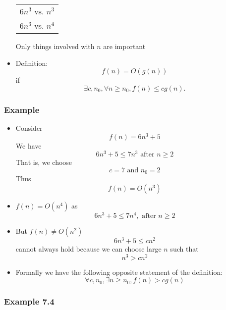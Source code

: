\begin{frame}[allowframebreaks]
\begin{itemize}
  \begin{center}
    \begin{tabular}{l}
$6n^3$ vs. $n^3$ \\
$6n^3$ vs. $n^4$
    \end{tabular}
\end{center}
Only things involved with $n$ are important
\item Definition:
  \begin{equation*}
  f(n)=O(g(n))
\end{equation*}
if 
  \begin{equation*}
    \exists c, n_0, \forall n \geq n_0,
f(n) \leq c g(n).
  \end{equation*}
\end{itemize}\end{frame} \begin{frame}[allowframebreaks] \frametitle{Example}
    \begin{itemize}
    \item Consider
      \begin{equation*}
      f(n) = 6n^3 + 5
    \end{equation*}
    We have
    \begin{equation*}
6n^3 + 5 \leq 7n^3 \text{ after } n \geq 2
\end{equation*}
That is, we choose 
\begin{equation*}
c=7 \text{ and } n_0 = 2
\end{equation*}
Thus 
\begin{equation*}
f(n) = O(n^3)
\end{equation*}
\item $f(n)=O(n^4)$ as 
  \begin{equation*}
6n^3+5 \leq 7n^4, \text{ after } n \geq 2
\end{equation*}
\item But $f(n) \neq O(n^2)$
  \begin{equation*}
  6n^3+5 \leq c n^2
\end{equation*}
cannot always hold because we can choose large $n$ such that
\begin{equation*}
n^3 > cn^2
\end{equation*}
\item Formally we have the following opposite statement of the definition:
\begin{equation*}
  \forall c, n_0, \exists n \geq n_0, f(n) > c g(n)
\end{equation*}
\end{itemize}\end{frame} \begin{frame}[allowframebreaks] \frametitle{Example 7.4}

\end{frame}
